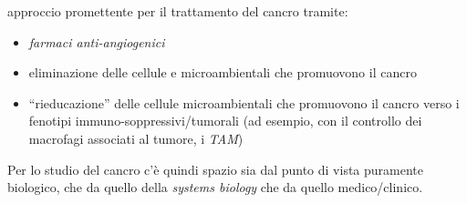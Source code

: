 \documentclass[a4paper,12pt, oneside]{book}
\begin{document}
approccio promettente per il trattamento del cancro tramite:
\begin{itemize}
  \item \textit{farmaci anti-angiogenici}
  \item eliminazione delle cellule e microambientali che promuovono il cancro 
  \item ``rieducazione'' delle cellule microambientali che promuovono il cancro
  verso i fenotipi immuno-soppressivi/tumorali (ad esempio, con il controllo dei
  macrofagi associati al tumore, i \textit{TAM}) 
\end{itemize}
Per lo studio del cancro c'è quindi spazio sia dal punto di vista puramente
biologico, che da quello della \textit{systems biology} che da quello
medico/clinico. 
\end{document}
